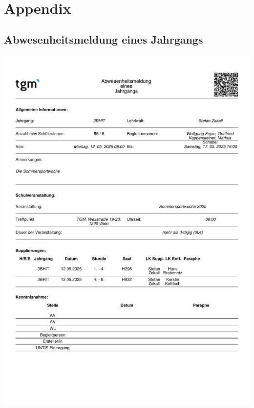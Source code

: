 
\cleardoublepage
{}
{}
\chapter*{Appendix}

\newpage

\section*{Abwesenheitsmeldung eines Jahrgangs}
{}

%


\begin{center}
	\includegraphics[width=\linewidth]{chapters/appendix/class_absence_form_3BHIT}
\end{center}


